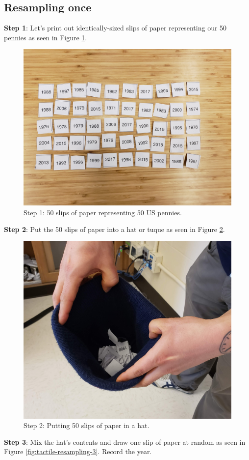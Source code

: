 \documentclass[
]{book}
\begin{document}
\hypertarget{resampling-once}{%
\subsection{Resampling once}\label{resampling-once}}

\textbf{Step 1}: Let's print out identically-sized slips of paper representing our 50 pennies as seen in Figure \ref{fig:tactile-resampling-1}.

\begin{figure}
\includegraphics[width=0.5\linewidth]{images/sampling/pennies/tactile_simulation/1_paper_slips} \caption{Step 1: 50 slips of paper representing 50 US pennies.}\label{fig:tactile-resampling-1}
\end{figure}

\textbf{Step 2}: Put the 50 slips of paper into a hat or tuque as seen in Figure \ref{fig:tactile-resampling-2}.

\begin{figure}
\includegraphics[width=0.5\linewidth]{images/sampling/pennies/tactile_simulation/2_insert_in_hat} \caption{Step 2: Putting 50 slips of paper in a hat.}\label{fig:tactile-resampling-2}
\end{figure}

\textbf{Step 3}: Mix the hat's contents and draw one slip of paper at random as seen in Figure \ref{fig:tactile-resampling-3}. Record the year.
\end{document}
